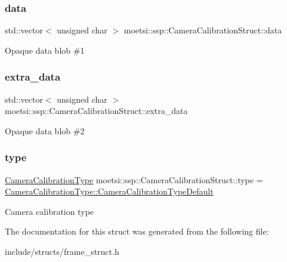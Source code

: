 \subsubsection{\texorpdfstring{data}{data}}
{\footnotesize\ttfamily std\+::vector$<$ unsigned char $>$ moetsi\+::ssp\+::\+Camera\+Calibration\+Struct\+::data}

Opaque data blob \#1 \mbox{\label{structmoetsi_1_1ssp_1_1CameraCalibrationStruct_aba76ffbffe0ba568444a7473f6d081d2}} 
\subsubsection{\texorpdfstring{extra\+\_\+data}{extra\_data}}
{\footnotesize\ttfamily std\+::vector$<$ unsigned char $>$ moetsi\+::ssp\+::\+Camera\+Calibration\+Struct\+::extra\+\_\+data}

Opaque data blob \#2 \mbox{\label{structmoetsi_1_1ssp_1_1CameraCalibrationStruct_a1ca6c9353a0523a437fe2318d560f39a}} 
\subsubsection{\texorpdfstring{type}{type}}
{\footnotesize\ttfamily \hyperlink{namespacemoetsi_1_1ssp_a1f51291db51233dc5865d42e6ee36ef8}{Camera\+Calibration\+Type} moetsi\+::ssp\+::\+Camera\+Calibration\+Struct\+::type = \hyperlink{namespacemoetsi_1_1ssp_a1f51291db51233dc5865d42e6ee36ef8ac32f0bb1b309dd3992d8e37bfaa00c78}{Camera\+Calibration\+Type\+::\+Camera\+Calibration\+Type\+Default}}

Camera calibration type 

The documentation for this struct was generated from the following file\+:\begin{DoxyCompactItemize}
\item 
include/structs/frame\+\_\+struct.\+h\end{DoxyCompactItemize}
